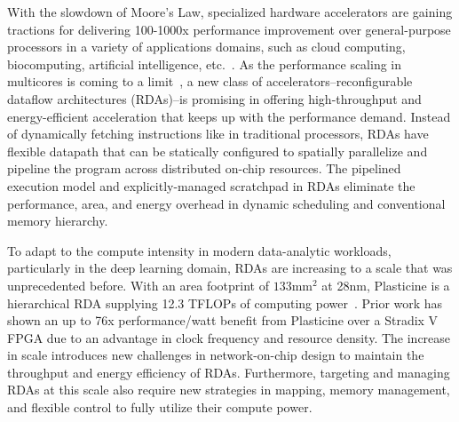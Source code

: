 
With the slowdown of Moore’s Law, specialized hardware accelerators are gaining tractions 
for delivering 100-1000x performance improvement over general-purpose
processors in a variety of applications domains, such as cloud computing, biocomputing, 
artificial intelligence, etc.~\cite{fpgacloudsurvey,bioaccel,genomicaccel}.
As the performance scaling in multicores is coming to a limit~\cite{multicorescale}, a new
class of accelerators--reconfigurable dataflow architectures (RDAs)--is promising in 
offering high-throughput and energy-efficient acceleration that keeps up with the performance demand.
Instead of dynamically fetching instructions like in traditional processors, RDAs have flexible datapath 
that can be statically configured to spatially parallelize and pipeline the program across
distributed on-chip resources. 
The pipelined execution model and explicitly-managed scratchpad in RDAs eliminate
the performance, area, and energy overhead in dynamic scheduling and conventional memory hierarchy.

To adapt to the compute intensity in modern data-analytic workloads, particularly in the deep learning
domain, RDAs are increasing to a scale that was unprecedented before.
With an area footprint of $133\text{mm}^2$ at 28nm, 
Plasticine is a hierarchical RDA supplying 12.3 TFLOPs of computing power~\cite{plasticine}.
Prior work has shown an up to 76x performance/watt benefit from Plasticine over a Stradix V FPGA 
due to an advantage in clock frequency and resource density.
The increase in scale introduces new challenges in network-on-chip design to maintain 
the throughput and energy efficiency of RDAs.
Furthermore, targeting and managing RDAs at this scale also require new strategies in mapping, 
memory management, and flexible control to fully utilize their compute power. 

